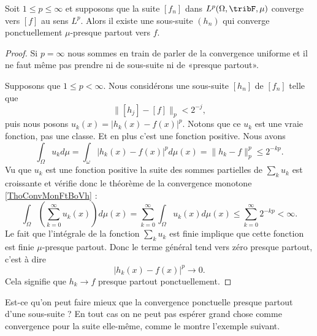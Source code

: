 \begin{proposition}  \label{PropWoywYG}
    Soit \( 1\leq p\leq \infty\) et supposons que la suite \( [f_n]\) dans \( L^p(\Omega,\tribF,\mu)\) converge vers \( [f]\) au sens \( L^p\). Alors il existe une sous-suite \( (h_n)\) qui converge ponctuellement \( \mu\)-presque partout vers \( f\).
\end{proposition}

\begin{proof}
    Si \( p=\infty\) nous sommes en train de parler de la convergence uniforme et il ne faut même pas prendre ni de sous-suite ni de «presque partout».

    Supposons que \( 1\leq p<\infty\). Nous considérons une sous-suite \( [h_n]\) de \( [f_n]\) telle que
    \begin{equation}
        \| [h_j]-[f] \|_p<2^{-j},
    \end{equation}
    puis nous posons \( u_k(x)=| h_k(x)-f(x) |^p\). Notons que ce \( u_k\) est une vraie fonction, pas une classe. Et en plus c'est une fonction positive. Nous avons
    \begin{equation}
        \int_{\Omega}u_kd\mu=\int_{\omega}| h_k(x)-f(x) |^pd\mu(x)=\| h_k-f \|_p^p\leq 2^{-kp}.
    \end{equation}
    Vu que \( u_k\) est une fonction positive la suite des sommes partielles de \( \sum_ku_k\) est croissante et vérifie donc le théorème de la convergence monotone \ref{ThoConvMonFtBoVh} :
    \begin{equation}
            \int_{\Omega}\left( \sum_{k=0}^{\infty}u_k(x) \right)d\mu(x)=\sum_{k=0}^{\infty}\int_{\Omega}u_k(x)d\mu(x)
            \leq\sum_{k=0}^{\infty}2^{-kp}<\infty.
    \end{equation}
    Le fait que l'intégrale de la fonction \( \sum_ku_k\) est finie implique que cette fonction est finie \( \mu\)-presque partout. Donc le terme général tend vers zéro presque partout, c'est à dire
    \begin{equation}
        | h_k(x)-f(x) |^p\to 0.
    \end{equation}
    Cela signifie que \( h_k\to f\) presque partout ponctuellement.
\end{proof}

Est-ce qu'on peut faire mieux que la convergence ponctuelle presque partout d'une sous-suite ? En tout cas on ne peut pas espérer grand chose comme convergence pour la suite elle-même, comme le montre l'exemple suivant.

